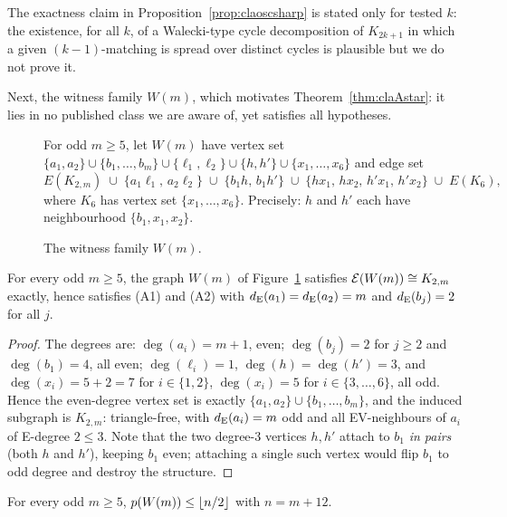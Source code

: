 \begin{remark}
The exactness claim in Proposition~\ref{prop:claoscsharp} is stated only
for tested $k$: the existence, for all $k$, of a Walecki-type cycle
decomposition of $K_{2k+1}$ in which a given $(k-1)$-matching is spread
over distinct cycles is plausible but we do not prove it.
\end{remark}

Next, the witness family $W(m)$, which motivates Theorem~\ref{thm:claAstar}:
it lies in no published class we are aware of, yet satisfies all
hypotheses.

\begin{figure}[h]
\centering
\begin{minipage}{0.92\textwidth}\small
For odd $m\ge 5$, let $W(m)$ have vertex set
$\{a_1,a_2\}\cup\{b_1,\dots,b_m\}\cup\{\ell_1,\ell_2\}\cup\{h,h'\}\cup\{x_1,\dots,x_6\}$
and edge set
\[
E(K_{2,m}) \;\cup\; \{a_1\ell_1,\,a_2\ell_2\} \;\cup\;
\{b_1h,\,b_1h'\} \;\cup\; \{hx_1,\,hx_2,\,h'x_1,\,h'x_2\} \;\cup\; E(K_6),
\]
where $K_6$ has vertex set $\{x_1,\dots,x_6\}$. Precisely: $h$ and $h'$
each have neighbourhood $\{b_1,x_1,x_2\}$.
\end{minipage}
\caption{The witness family $W(m)$.}\label{fig:claWm}
\end{figure}

\begin{lemma}\label{lem:claWmEV}
For every odd $m\ge 5$, the graph $W(m)$ of Figure~\ref{fig:claWm}
satisfies $\mathcal{E}(W(m))\cong K_{2,m}$ exactly, hence satisfies (A1) and (A2)
with $d_{\mathrm{E}}(a_1)=d_{\mathrm{E}}(a_2)=m$ and $d_{\mathrm{E}}(b_j)=2$ for all $j$.
\end{lemma}

\begin{proof}
The degrees are:
$\deg(a_i)=m+1$, even; $\deg(b_j)=2$ for $j\ge2$ and $\deg(b_1)=4$, all
even; $\deg(\ell_i)=1$, $\deg(h)=\deg(h')=3$, and $\deg(x_i)=5+2=7$ for
$i\in\{1,2\}$, $\deg(x_i)=5$ for $i\in\{3,\dots,6\}$, all odd. Hence the
even-degree vertex set is exactly $\{a_1,a_2\}\cup\{b_1,\dots,b_m\}$, and
the induced subgraph is $K_{2,m}$: triangle-free, with $d_{\mathrm{E}}(a_i)=m$ odd
and all EV-neighbours of $a_i$ of E-degree $2\le3$. Note that the two
degree-$3$ vertices $h,h'$ attach to $b_1$ \emph{in pairs} (both $h$ and
$h'$), keeping $b_1$ even; attaching a single such vertex would flip $b_1$
to odd degree and destroy the structure.
\end{proof}

\begin{proposition}\label{prop:claWmbound}
For every odd $m\ge 5$, $p(W(m))\le\left\lfloor n/2 \right\rfloor$ with $n=m+12$.
\end{proposition}


